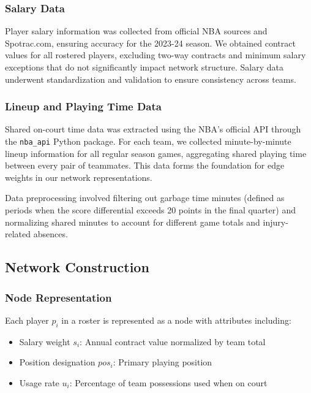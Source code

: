 \documentclass[11pt]{article}
\begin{document}
\subsubsection{Salary Data}

Player salary information was collected from official NBA sources and Spotrac.com, ensuring accuracy for the 2023-24 season. We obtained contract values for all rostered players, excluding two-way contracts and minimum salary exceptions that do not significantly impact network structure. Salary data underwent standardization and validation to ensure consistency across teams.

\subsubsection{Lineup and Playing Time Data}

Shared on-court time data was extracted using the NBA's official API through the \texttt{nba\_api} Python package. For each team, we collected minute-by-minute lineup information for all regular season games, aggregating shared playing time between every pair of teammates. This data forms the foundation for edge weights in our network representations.

Data preprocessing involved filtering out garbage time minutes (defined as periods when the score differential exceeds 20 points in the final quarter) and normalizing shared minutes to account for different game totals and injury-related absences.

\subsection{Network Construction}

\subsubsection{Node Representation}

Each player $p_i$ in a roster is represented as a node with attributes including:
\begin{itemize}
    \item Salary weight $s_i$: Annual contract value normalized by team total
    \item Position designation $pos_i$: Primary playing position
    \item Usage rate $u_i$: Percentage of team possessions used when on court
\end{itemize}
\end{document}

